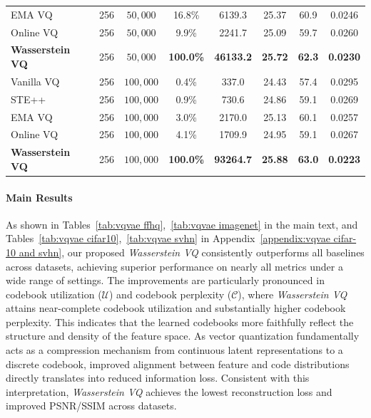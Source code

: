 \begin{table}[!t]
{\begin{tabular}{@{}lccccccc@{}}
    EMA VQ  & 256 & $50{,}000$ & 16.8\% & 6139.3 & 25.37 & 60.9 & 0.0246 \\
    Online VQ & 256 & $50{,}000$ & 9.9\% & 2241.7 & 25.09 & 59.7 & 0.0260 \\
    \textbf{Wasserstein VQ} & 256 & $50{,}000$ & \textbf{100.0\%} & \textbf{46133.2} & \textbf{25.72} & \textbf{62.3} & \textbf{0.0230} \\
    \midrule
    Vanilla VQ & 256 & $100{,}000$ & 0.4\% & 337.0 & 24.43 & 57.4 & 0.0295 \\
    STE++ & 256 & $100{,}000$ & 0.9\% & 730.6 & 24.86 & 59.1 & 0.0269 \\
    EMA VQ  & 256 & $100{,}000$ & 3.0\% & 2170.0 & 25.13 & 60.1 & 0.0257 \\
    Online VQ  & 256 & $100{,}000$ & 4.1\% & 1709.9 & 24.95 & 59.1 & 0.0267 \\
    \textbf{Wasserstein VQ} & 256 & $100{,}000$ & \textbf{100.0\%} & \textbf{93264.7} & \textbf{25.88} & \textbf{63.0} & \textbf{0.0223} \\
    \bottomrule
  \end{tabular}
}
\vspace{-2ex}
\end{table}


\paragraph{Main Results} 
As shown in Tables~\ref{tab:vqvae ffhq},~\ref{tab:vqvae imagenet} in the main text, and Tables~\ref{tab:vqvae cifar10},~\ref{tab:vqvae svhn} in Appendix~\ref{appendix:vqvae cifar-10 and svhn}, our proposed \emph{Wasserstein VQ} consistently outperforms all baselines across datasets, achieving superior performance on nearly all metrics under a wide range of settings. 
The improvements are particularly pronounced in codebook utilization ($\mathcal{U}$) and codebook perplexity ($\mathcal{C}$), where \emph{Wasserstein VQ} attains near-complete codebook utilization and substantially higher codebook perplexity. This indicates that the learned codebooks more faithfully reflect the structure and density of the feature space.
As vector quantization fundamentally acts as a compression mechanism from continuous latent representations to a discrete codebook, improved alignment between feature and code distributions directly translates into reduced information loss. Consistent with this interpretation, \emph{Wasserstein VQ} achieves the lowest reconstruction loss and improved PSNR/SSIM across datasets.

